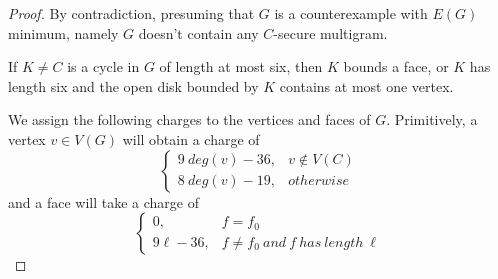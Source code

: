\begin{proof}
By contradiction, presuming that $G$ is a counterexample with $E(G)$ minimum, namely $G$ doesn't contain any $C$-secure multigram.

\begin{corollary}
If $K \ne C$ is a cycle in $G$ of length at most six, then $K$ bounds a face,
or $K$ has length six and the open disk bounded by $K$ contains at most
one vertex.
\end{corollary}

We assign the following charges to the vertices and faces of $G$. Primitively, a vertex $v \in V(G)$ will obtain a charge of 
\begin{equation*}
\left\{
    \begin{array}{ll}
    9 \ deg(v) -36, & v \notin V(C)  \\
    8 \ deg(v) - 19, & otherwise
    \end{array}
\right.
\end{equation*}
and a face will take a charge of 
\begin{equation*}
\left\{
    \begin{array}{ll}
    0, &  f = f_0\\
    9\ell -36, & f \neq f_0 \ and \ f \ has \ length \ \ell
    \end{array}
\right.
\end{equation*}


\end{proof}
